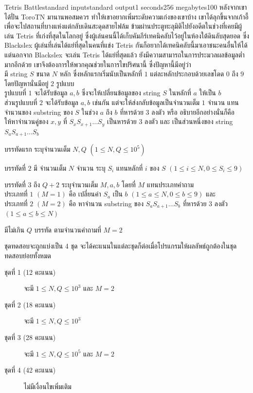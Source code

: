 \documentclass[11pt,a4paper]{article}
\begin{document}
\begin{problem}{Tetris Battle}{standard input}{standard output}{1 seconds}{256 megabytes}{100}
หลังจากเขาได้ปั่น ToroTN มานานพอสมควร ทำให้เขาอยากเพิ่มระดับความเก่งของเขาบ้าง เขาได้ลุกขึ้นจากเก้าอี้เพื่อจะไปสถานที่บางแห่งแต่กลับเดินสะดุดสายไฟล้ม ข้ามผ่านประตูทะลุมิติไปยังอดีตในช่วงที่เคยมีผู้เล่น Tetris ที่เก่งที่สุดในโลกอยู่ ซึ่งผู้เล่นคนนี้ได้เก็บคัมภีร์เทคนิคลับไว้อยู่ในห้องใต้ดินลับสุดยอด ซึ่ง Blackslex ผู้เล่นที่เล่นได้แย่ที่สุดในคนที่แข่ง Tetris กันก็อยากได้เทคนิคลับนี้มาเอาชนะคนอื่นให้ได้ แต่นอกจาก Blackslex จะเล่น Tetris ได้แย่ที่สุดแล้ว ยังมีความสามารถในการประมวลผลข้อมูลต่ำมากอีกด้วย เขาจึงต้องการให้พวกคุณช่วยในการไขปริศนานี้ ซึ่งปัญหานี้มีอยู่ว่า \\
มี string $S$ ขนาด $N$ หลัก ซึ่งหลักแรกเริ่มนับเป็นหลักที่ $1$ แต่ละหลักประกอบด้วยเลขโดด $0$ ถึง $9$ โดยปัญหานั่นมีอยู่ $2$ รูปแบบ \\
รูปแบบที่ $1$ จะได้รับข้อมูล $a, b$ ซึ่งจะให้เปลี่ยนข้อมูลของ string $S$ ในหลักที่ $a$ ให้เป็น $b$ \\
ส่วนรูปแบบที่ $2$ จะได้รับข้อมูล $a, b$ เช่นกัน แต่จะให้ส่งกลับข้อมูลเป็นจำนวนเต็ม $1$ จำนวน แทนจำนวนของ substring ของ $S$ ในช่วง $a$ ถึง $b$ ที่หารด้วย $3$ ลงตัว หรือ อธิบายอีกอย่างนั่นก็คือ ให้หาจำนวนคู่ของ $x, y$ ที่ $S_xS_{x+1}\dots S_y$ เป็นหารด้วย $3$ ลงตัว และ เป็นส่วนหนึ่งของ string $S_aS_{a+1}\dots S_b$

\InputFile

บรรทัดแรก ระบุจำนวนเต็ม $N, Q$ $(1 \leq N, Q \leq 10^5)$

บรรทัดที่ $2$ มี จำนวนเต็ม $N$ จำนวน ระบุ $S_i$ แทนหลักที่ $i$ ของ $S$ $(1 \leq i \leq N, 0 \leq S_i \leq 9)$

บรรทัดที่ $3$ ถึง $Q + 2$ ระบุจำนวนเต็ม $M, a, b$ โดยที่ $M$ แทนประเภทคำถาม \\
ประเภทที่ $1$ $(M = 1)$ คือ เปลี่ยนค่า $S_a$ เป็น $b$ $(1 \leq a \leq N, 0 \leq b \leq 9)$ และ \\
ประเภทที่ $2$ $(M = 2)$ คือ หาจำนวน substring ของ $S_aS_{a+1}\dots S_b$ ที่หารด้วย $3$ ลงตัว $(1 \leq a \leq b \leq N)$

\OutputFile
มีไม่เกิน $Q$ บรรทัด ตามจำนวนคำถามที่ $M = 2$

\Scoring
ชุดทดสอบจะถูกแบ่งเป็น 4 ชุด จะได้คะแนนในแต่ละชุดก็ต่อเมื่อโปรแกรมให้ผลลัพธ์ถูกต้องในชุดทดสอบย่อยทั้งหมด

\begin{description}

\item[ชุดที่ 1 (12 คะแนน)] จะมี $ 1 \leq N, Q \leq 10^3$ และ $M = 2$
\item[ชุดที่ 2 (18 คะแนน)] จะมี $ 1 \leq N, Q \leq 10^3$
\item[ชุดที่ 3 (28 คะแนน)] จะมี $ 1 \leq N, Q \leq 10^5$ และ $M = 2$
\item[ชุดที่ 4 (42 คะแนน)] ไม่มีเงื่อนไขเพิ่มเติม 

\end{description}

\Examples

\begin{example}
%
%
\end{example}

\end{problem}
\end{document}
